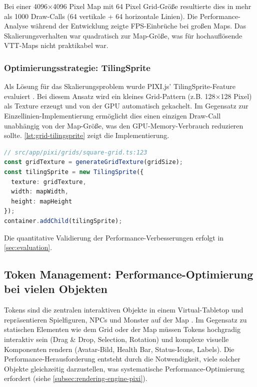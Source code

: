 Bei einer 4096×4096 Pixel Map mit 64 Pixel Grid-Größe resultierte dies in mehr als 1000 Draw-Calls (64 vertikale + 64 horizontale Linien). Die Performance-Analyse während der Entwicklung zeigte \ac{FPS}-Einbrüche bei großen Maps. Das Skalierungsverhalten war quadratisch zur Map-Größe, was für hochauflösende \ac{VTT}-Maps nicht praktikabel war.

\subsubsection{Optimierungsstrategie: TilingSprite}

Als Lösung für das Skalierungsproblem wurde PIXI.js' TilingSprite-Feature evaluiert \autocite{PixiTilingSprite2024}. Bei diesem Ansatz wird ein kleines Grid-Pattern (z.B. 128×128 Pixel) als Texture erzeugt und von der \ac{GPU} automatisch gekachelt. Im Gegensatz zur Einzellinien-Implementierung ermöglicht dies einen einzigen Draw-Call unabhängig von der Map-Größe, was den \ac{GPU}-Memory-Verbrauch reduzieren sollte. \autoref{lst:grid-tilingsprite} zeigt die Implementierung.

\begin{lstlisting}[float,language=TypeScript,caption={Grid-Rendering mit TilingSprite},label=lst:grid-tilingsprite]
// src/app/pixi/grids/square-grid.ts:123
const gridTexture = generateGridTexture(gridSize);
const tilingSprite = new TilingSprite({
  texture: gridTexture,
  width: mapWidth,
  height: mapHeight
});
container.addChild(tilingSprite);
\end{lstlisting}

Die quantitative Validierung der Performance-Verbesserungen erfolgt in \autoref{sec:evaluation}.

\subsection{Token Management: Performance-Optimierung bei vielen Objekten}
\label{subsec:token-management}

Tokens sind die zentralen interaktiven Objekte in einem Virtual-Tabletop und repräsentieren Spielfiguren, NPCs und Monster auf der Map \autocite{FoundryTokens2024}. Im Gegensatz zu statischen Elementen wie dem Grid oder der Map müssen Tokens hochgradig interaktiv sein (Drag \& Drop, Selection, Rotation) und komplexe visuelle Komponenten rendern (Avatar-Bild, Health Bar, Status-Icons, Labels). Die Performance-Herausforderung entsteht durch die Notwendigkeit, viele solcher Objekte gleichzeitig darzustellen, was systematische Performance-Optimierung erfordert (siehe \autoref{subsec:rendering-engine-pixi}).

